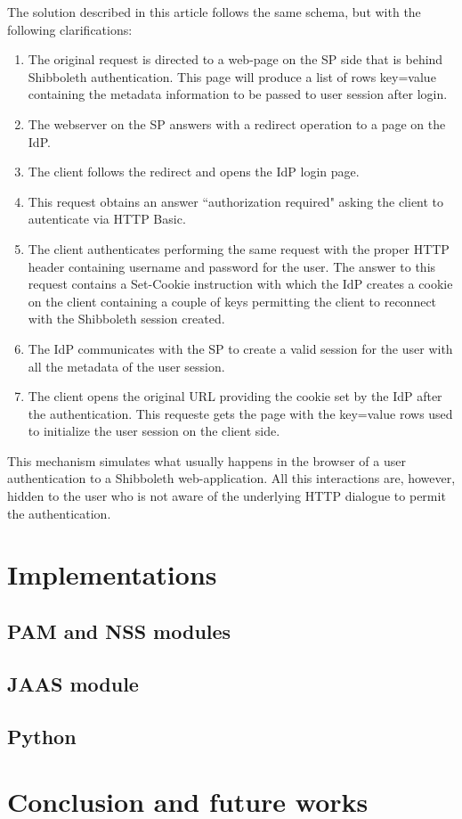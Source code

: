 The solution described in this article follows the same schema, but with the following clarifications:
\begin{enumerate}
\item The original request is directed to a web-page on the SP side that is behind Shibboleth authentication.
This page will produce a list of rows key=value containing the metadata information to be passed to user session after login.
\item The webserver on the SP answers with a redirect operation to a page on the IdP.
\item The client follows the redirect and opens the IdP login page.
\item This request obtains an answer ``authorization required" asking the client to autenticate via HTTP Basic.
\item The client authenticates performing the same request with the proper HTTP header containing username and password for the user.
The answer to this request contains a Set-Cookie instruction with which the IdP creates a cookie on the client containing a couple of
keys permitting the client to reconnect with the Shibboleth session created.
\item The IdP communicates with the SP to create a valid session for the user with all the metadata of the user session.
\item The client opens the original URL providing the cookie set by the IdP after the authentication.
This requeste gets the page with the key=value rows used to initialize the user session on the client side.
\end{enumerate}

This mechanism simulates what usually happens in the browser of a user authentication to a Shibboleth web-application.
All this interactions are, however, hidden to the user who is not aware of the underlying HTTP dialogue to permit the authentication.

\label{sec:implementations}
\section{Implementations}

\label{sec:pamnss}
\subsection{PAM and NSS modules}

\label{sec:jaas}
\subsection{JAAS module}

\label{sec:python}
\subsection{Python}

\label{sec:conclusion}
\section{Conclusion and future works}

